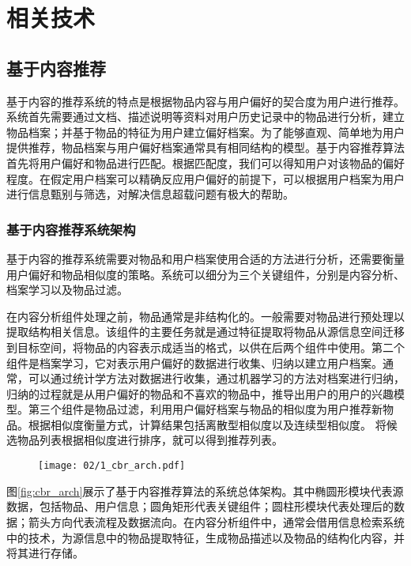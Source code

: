 
\chapter{相关技术}
\label{chap:related}

\section{基于内容推荐}

基于内容的推荐系统的特点是根据物品内容与用户偏好的契合度为用户进行推荐。系统首先需要通过文档、描述说明等资料对用户历史记录中的物品进行分析，建立物品档案；并基于物品的特征为用户建立偏好档案。为了能够直观、简单地为用户提供推荐，物品档案与用户偏好档案通常具有相同结构的模型。基于内容推荐算法首先将用户偏好和物品进行匹配。根据匹配度，我们可以得知用户对该物品的偏好程度。在假定用户档案可以精确反应用户偏好的前提下，可以根据用户档案为用户进行信息甄别与筛选，对解决信息超载问题有极大的帮助。

\subsection{基于内容推荐系统架构}
基于内容的推荐系统需要对物品和用户档案使用合适的方法进行分析，还需要衡量用户偏好和物品相似度的策略。系统可以细分为三个关键组件，分别是内容分析、档案学习以及物品过滤。

在内容分析组件处理之前，物品通常是非结构化的。一般需要对物品进行预处理以提取结构相关信息。该组件的主要任务就是通过特征提取将物品从源信息空间迁移到目标空间，将物品的内容表示成适当的格式，以供在后两个组件中使用。第二个组件是档案学习，它对表示用户偏好的数据进行收集、归纳以建立用户档案。通常，可以通过统计学方法对数据进行收集，通过机器学习的方法对档案进行归纳，归纳的过程就是从用户偏好的物品和不喜欢的物品中，推导出用户的用户的兴趣模型。第三个组件是物品过滤，利用用户偏好档案与物品的相似度为用户推荐新物品。根据相似度衡量方式，计算结果包括离散型相似度以及连续型相似度。
将候选物品列表根据相似度进行排序，就可以得到推荐列表。

\begin{figure}
 \centering
 \texttt{[image: 02/1\_cbr\_arch.pdf]}
\end{figure}

图\ref{fig:cbr_arch}展示了基于内容推荐算法的系统总体架构。其中椭圆形模块代表源数据，包括物品、用户信息；圆角矩形代表关键组件；圆柱形模块代表处理后的数据；箭头方向代表流程及数据流向。在内容分析组件中，通常会借用信息检索系统中的技术，为源信息中的物品提取特征，生成物品描述以及物品的结构化内容，并将其进行存储。

